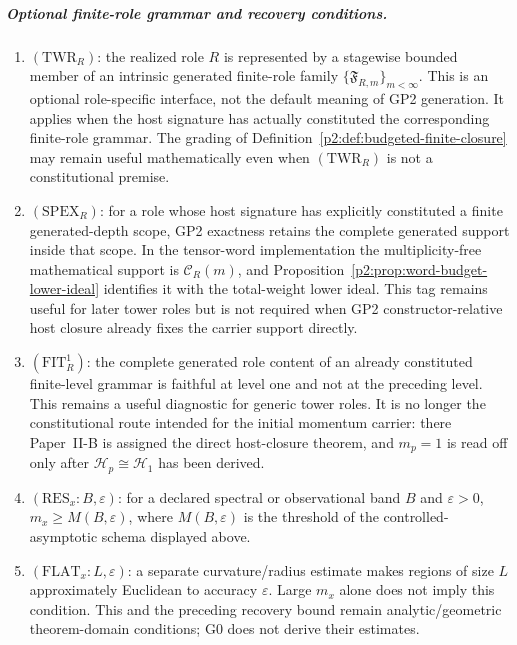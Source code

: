 \documentclass[12pt,a4paper]{article}
\begin{document}
\begin{definition}
\subparagraph{Optional finite-role grammar and recovery conditions.}
\begin{enumerate}[label=(\roman*),leftmargin=2em,resume]
\item \((\mathrm{TWR}_R)\): the realized role \(R\) is represented by a
stagewise bounded member of an intrinsic generated finite-role family
\(\{\mathfrak F_{R,m}\}_{m<\infty}\).  This is an optional role-specific
interface, not the default meaning of GP2 generation.  It applies when the
host signature has actually constituted the corresponding finite-role grammar.
The grading of Definition~\ref{p2:def:budgeted-finite-closure} may remain
useful mathematically even when \((\mathrm{TWR}_R)\) is not a constitutional
premise.
\item \((\mathrm{SPEX}_R)\): for a role whose host signature has explicitly
constituted a finite generated-depth scope, GP2 exactness retains the complete
generated support inside that scope.  In the tensor-word implementation the
multiplicity-free mathematical support is \(\mathcal C_R(m)\), and
Proposition~\ref{p2:prop:word-budget-lower-ideal} identifies it with the
total-weight lower ideal.  This tag remains useful for later tower roles but is
not required when GP2 constructor-relative host closure already fixes the
carrier support directly.
\item \((\mathrm{FIT}_R^1)\): the complete generated role content of an
already constituted finite-level grammar is faithful at level one and not at
the preceding level.  This remains a useful diagnostic for generic tower
roles.  It is no longer the constitutional route intended for the initial
momentum carrier: there Paper~II-B is assigned the direct host-closure theorem,
and \(m_p=1\) is read off only after \(\mathcal H_p\cong\mathcal H_1\) has been
derived.
\item \((\mathrm{RES}_x{:}B,\varepsilon)\): for a declared spectral or
observational band \(B\) and \(\varepsilon>0\),
\(m_x\ge M(B,\varepsilon)\), where \(M(B,\varepsilon)\) is the threshold of
the controlled-asymptotic schema displayed above.
\item \((\mathrm{FLAT}_x{:}L,\varepsilon)\): a separate curvature/radius
estimate makes regions of size \(L\) approximately Euclidean to accuracy
\(\varepsilon\).  Large \(m_x\) alone does not imply this condition.  This
and the preceding recovery bound remain analytic/geometric theorem-domain
conditions; G0 does not derive their estimates.
\end{enumerate}
\end{definition}
\end{document}
